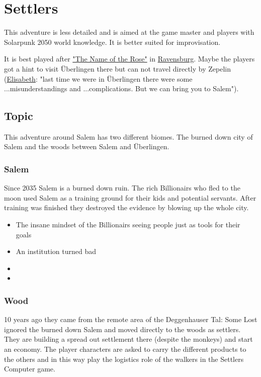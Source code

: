 \chapter{Settlers}
\label{ch:settlers}

This adventure is less detailed and is aimed at the game master and players with Solarpunk 2050 world knowledge. It is better suited for improvisation.

It is best played after  \hyperref[ch:the name of the rose]{"The Name of the Rose"} in \hyperref[subsec:Ravensburg]{Ravensburg}. Maybe the players got a hint to visit Überlingen there but can not travel directly by Zepelin (\hyperref[sec:Jaime and Elisabeth]{Elisabeth}: "last time we were in Überlingen there were some ...misunderstandings and ...complications. But we can bring you to Salem").

\section{Topic}

This adventure around Salem has two different biomes. The burned down city of Salem and the woods between Salem and Überlingen.

\subsection{Salem}

Since 2035 Salem is a burned down ruin.
The rich Billionairs who fled to the moon used Salem as a training ground for their kids and potential servants. After training was finished they destroyed the evidence by blowing up the whole city.

\begin{itemize}
    \item The insane mindset of the Billionairs seeing people just as tools for their goals
    \item An institution turned bad
    \item
    \item
\end{itemize}

\subsection{Wood}

10 years ago they came from the remote area of the Deggenhauser Tal: Some Lost ignored the burned down Salem and moved directly to the woods as settlers. They are building a spread out settlement there (despite the monkeys) and start an economy. The player characters are asked to carry the different products to the others and in this way play the logistics role of the walkers in the Settlers Computer game.

